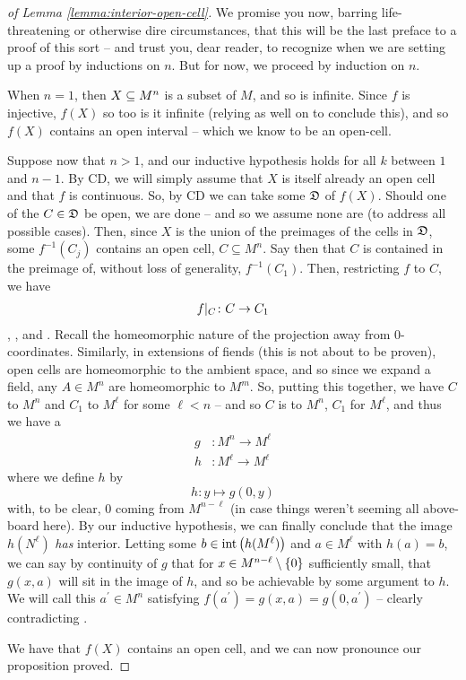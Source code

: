 \begin{proof}[of Lemma \ref{lemma:interior-open-cell}]
  We promise you now, barring life-threatening or otherwise dire circumstances, that this will be the last preface to a proof of this sort -- and trust you, dear reader, to recognize when we are setting up a proof by inductions on $n$. But for now, we proceed by induction on $n$.
  
  When $n = 1$, then $X \subseteq M^{n}$ is a \inhb subset of $M$, and so is infinite. Since $f$ is injective, $f(X)$ so too is it infinite (relying as well on  to conclude this), and so $f(X)$ contains an open interval -- which we know to be an open-cell.
  
  Suppose now that $n > 1$, and our inductive hypothesis holds for all $k$ between $1$ and $n -1$. By CD, we will simply assume that $X$ is itself already an open cell and that $f$ is continuous. So, by CD we can take some \cd $\mathfrak{D}$ of $f(X)$. Should one of the $C \in \mathfrak{D}$ be open, we are done -- and so we assume none are (to address all possible cases). Then, since $X$ is the union of the preimages of the cells in $\mathfrak{D}$, some $f^{-1}(C_j)$ contains an open cell, $C \subseteq M^n$. Say then that $C$ is contained in the preimage of, without loss of generality, $f^{-1}(C_1)$. Then, restricting $f$ to $C$, we have
  \begin{align*}
    f \vert_{C} \colon C \to C_1
  \end{align*}
  \cont, , and \inj. Recall the homeomorphic nature of the projection away from 0-coordinates. Similarly, in extensions of fiends (this is not about to be proven), open cells are homeomorphic to the ambient space, and so since we expand a field, any $A \in M^n$ are  homeomorphic to $M^m$. So, putting this together, we have $C$ \homeom to $M^n$ and $C_1$ \homeom to $M^{\ell}$ for some $\ell < n$ -- and so $C$ is  \homeomic to $M^n$, $C_1$ for $M^{\ell}$, and thus we have a \cont {} \inj 
    \begin{align*}
      g &\colon M^n \to M^{\ell} \\
      h &\colon M^{\ell} \to M^{\ell}
    \end{align*}
    where we define $h$ by
    $$
      h \colon y \mapsto g(0, y)
    $$
    with, to be clear, $0$ coming from $M^{n - \ell}$ (in case things weren't seeming all above-board here). By our inductive hypothesis, we can finally conclude that the image $h(N^{\ell})$ \emph{has} interior. Letting some $b \in \operatorname{int}\left(h(M^{\ell})\right)$ and $a \in M^{\ell}$ with $h(a) = b$, we can say by continuity of $g$ that for $x \in M^{n - \ell} \setminus \{ 0 \}$ sufficiently small, that $g(x, a)$  will sit in the image of $h$, and so be achievable by some argument to $h$. We will call this $a^{\prime} \in M^n$ satisfying $f(a^{\prime}) = g(x, a) = g(0, a^{\prime})$ -- clearly contradicting \injtvty. 
    
    We have that $f(X)$ contains an open cell, and we can now pronounce our proposition proved.
    \smartqed
\end{proof}

